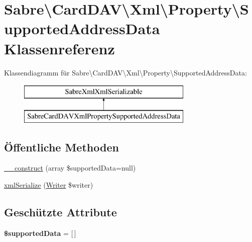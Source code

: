 \hypertarget{class_sabre_1_1_card_d_a_v_1_1_xml_1_1_property_1_1_supported_address_data}{}\section{Sabre\textbackslash{}Card\+D\+AV\textbackslash{}Xml\textbackslash{}Property\textbackslash{}Supported\+Address\+Data Klassenreferenz}
\label{class_sabre_1_1_card_d_a_v_1_1_xml_1_1_property_1_1_supported_address_data}
Klassendiagramm für Sabre\textbackslash{}Card\+D\+AV\textbackslash{}Xml\textbackslash{}Property\textbackslash{}Supported\+Address\+Data\+:\begin{figure}[H]
\begin{center}
\leavevmode
\includegraphics[height=2.000000cm]{class_sabre_1_1_card_d_a_v_1_1_xml_1_1_property_1_1_supported_address_data}
\end{center}
\end{figure}
\subsection*{Öffentliche Methoden}
\begin{DoxyCompactItemize}
\item 
\mbox{\hyperlink{class_sabre_1_1_card_d_a_v_1_1_xml_1_1_property_1_1_supported_address_data_abe196dc4a6c08418ef0410d419db8eb7}{\+\_\+\+\_\+construct}} (array \$supported\+Data=null)
\item 
\mbox{\hyperlink{class_sabre_1_1_card_d_a_v_1_1_xml_1_1_property_1_1_supported_address_data_aa256af8c77abf22674375c882a89fb77}{xml\+Serialize}} (\mbox{\hyperlink{class_sabre_1_1_v_object_1_1_writer}{Writer}} \$writer)
\end{DoxyCompactItemize}
\subsection*{Geschützte Attribute}
\begin{DoxyCompactItemize}
\item 
\mbox{\label{class_sabre_1_1_card_d_a_v_1_1_xml_1_1_property_1_1_supported_address_data_a35e7937557e893ddacbb6b058ab71285}} 
{\bfseries \$supported\+Data} = \mbox{[}$\,$\mbox{]}
\end{DoxyCompactItemize}


